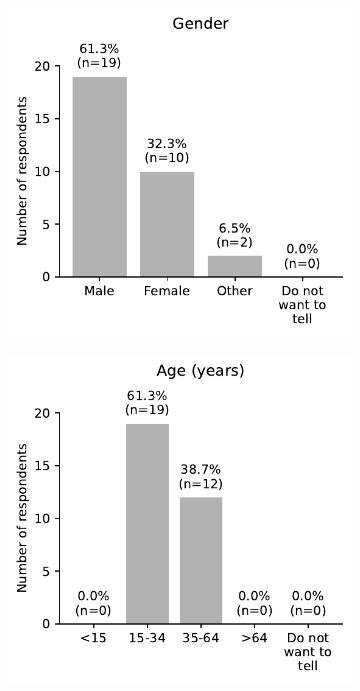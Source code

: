 \begin{appendices}
\begin{figure}[H]
	\begin{subfigure}[b]{0.5\textwidth}
		\includegraphics[width=\textwidth]{visual/figures/survey/13.pdf}
	\end{subfigure}%
	\hfill
	\begin{subfigure}[b]{0.5\textwidth}
		\includegraphics[width=\textwidth]{visual/figures/survey/14.pdf}
	\end{subfigure}%
	\newline
\end{figure}

\end{appendices}
